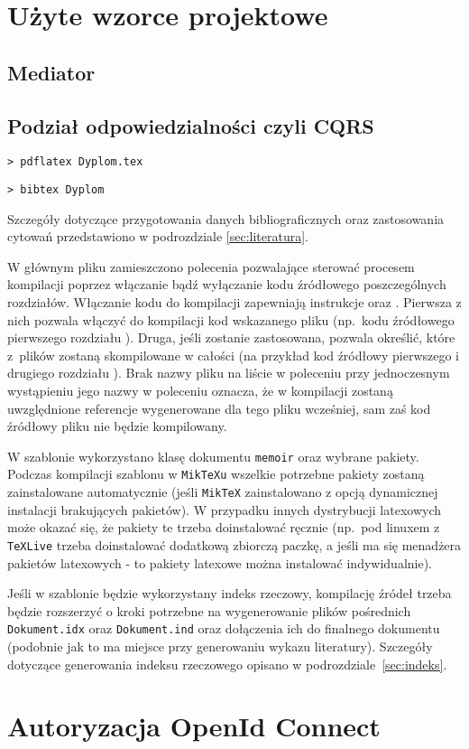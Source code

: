 \section{Użyte wzorce projektowe}
\subsection{Mediator}
\subsection{Podział odpowiedzialności czyli CQRS}
\begin{lstlisting}[basicstyle=\ttfamily]
> pdflatex Dyplom.tex
\end{lstlisting}

\begin{lstlisting}[basicstyle=\ttfamily]
> bibtex Dyplom
\end{lstlisting}
Szczegóły dotyczące przygotowania danych bibliograficznych oraz zastosowania cytowań przedstawiono w podrozdziale \ref{sec:literatura}.

W głównym pliku zamieszczono polecenia pozwalające sterować procesem kompilacji poprzez włączanie bądź wyłączanie kodu źródłowego poszczególnych rozdziałów. Włączanie kodu do kompilacji zapewniają instrukcje \verb++ oraz \verb++. Pierwsza z nich pozwala włączyć do kompilacji kod wskazanego pliku (np.\ kodu źródłowego pierwszego rozdziału \verb++). Druga, jeśli zostanie zastosowana, pozwala określić, które z~plików zostaną skompilowane w całości (na przykład kod źródłowy pierwszego i drugiego rozdziału \verb++).
Brak nazwy pliku na liście w poleceniu \verb++ przy jednoczesnym wystąpieniu jego nazwy w poleceniu \verb++ oznacza, że w kompilacji zostaną uwzględnione referencje wygenerowane dla tego pliku wcześniej, sam zaś kod źródłowy pliku nie będzie kompilowany. 

W szablonie wykorzystano klasę dokumentu \texttt{memoir} oraz wybrane pakiety. Podczas kompilacji szablonu w \texttt{MikTeXu} wszelkie potrzebne pakiety zostaną zainstalowane automatycznie (jeśli \texttt{MikTeX} zainstalowano z opcją dynamicznej instalacji brakujących pakietów). W przypadku innych dystrybucji latexowych może okazać się, że pakiety te trzeba doinstalować ręcznie (np.\ pod linuxem z \texttt{TeXLive} trzeba doinstalować dodatkową zbiorczą paczkę, a jeśli ma się menadżera pakietów latexowych - to pakiety latexowe można instalować indywidualnie).

Jeśli w szablonie będzie wykorzystany indeks rzeczowy, kompilację źródeł trzeba będzie rozszerzyć o kroki potrzebne na wygenerowanie plików pośrednich \texttt{Dokument.idx} oraz \texttt{Dokument.ind} oraz dołączenia ich do finalnego dokumentu (podobnie jak to ma miejsce przy generowaniu wykazu literatury).
Szczegóły dotyczące generowania indeksu rzeczowego opisano w podrozdziale~\ref{sec:indeks}.
\section{Autoryzacja OpenId Connect}